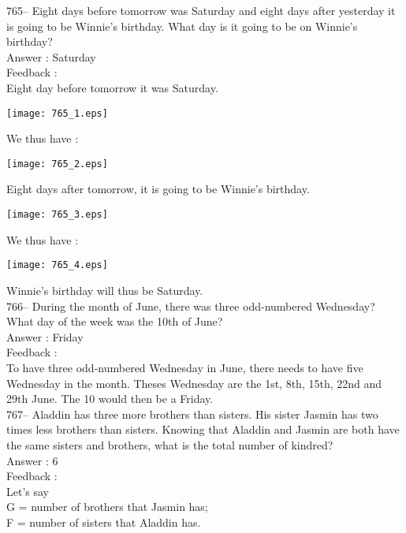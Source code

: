 \documentclass[letterpaper, 12pt]{article}
\begin{document}
765-- Eight days before tomorrow was Saturday and eight days after yesterday it is going to be Winnie's birthday. What day is it going to be on Winnie's birthday?\\

Answer : Saturday\\

Feedback : \\
Eight day before tomorrow it was Saturday.\\
\begin{center}
\texttt{[image: 765\_1.eps]}
\end{center}
We thus have :\\\begin{center}
\texttt{[image: 765\_2.eps]}
\end{center}
Eight days after tomorrow, it is going to be Winnie's birthday.\\
\begin{center}
\texttt{[image: 765\_3.eps]}
\end{center}
We thus have :\\
\begin{center}
\texttt{[image: 765\_4.eps]}
\end{center}
Winnie's birthday will thus be Saturday.\\

766-- During the month of June, there was three odd-numbered Wednesday? What day of the week was the 10th of June?\\

Answer : Friday\\

Feedback : \\
To have three odd-numbered Wednesday in June, there needs to have five Wednesday in the month. Theses Wednesday are the 1st, 8th, 15th, 22nd and 29th June. The 10 would then be a Friday.  \\


767-- Aladdin has three more brothers than sisters. His sister Jasmin has two times less brothers than sisters. Knowing that Aladdin and Jasmin are both have the same sisters and brothers, what is the total number of kindred?\\

Answer : 6 \\

Feedback : \\
Let's say\\
G = number of brothers that Jasmin has;\\
F = number of sisters that Aladdin has.\\
\end{document}
